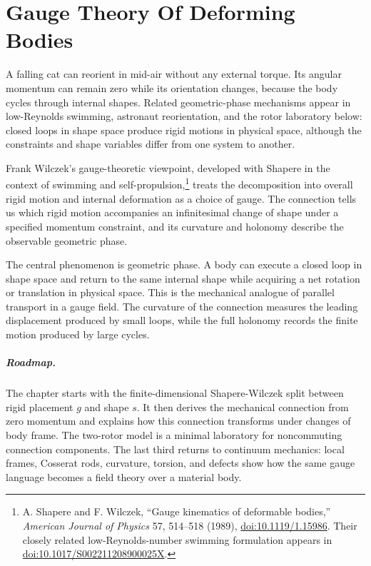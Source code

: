 \chapter{Gauge Theory Of Deforming Bodies}
\label{chap:deforming-body}

A falling cat can reorient in mid-air without any external torque. Its angular
momentum can remain zero while its orientation changes, because the body cycles
through internal shapes. Related geometric-phase mechanisms appear in
low-Reynolds swimming, astronaut reorientation, and the rotor laboratory below:
closed loops in shape space produce rigid motions in physical space, although
the constraints and shape variables differ from one system to another.

Frank Wilczek's gauge-theoretic viewpoint, developed with Shapere in the
context of swimming and self-propulsion,\footnote{A. Shapere and F. Wilczek,
``Gauge kinematics of
deformable bodies,'' \emph{American Journal of Physics} 57, 514--518 (1989),
\href{https://doi.org/10.1119/1.15986}{doi:10.1119/1.15986}. Their closely
related low-Reynolds-number swimming formulation appears in
\href{https://doi.org/10.1017/S002211208900025X}{doi:10.1017/S002211208900025X}.}
treats the decomposition into overall rigid motion and internal deformation as
a choice of gauge.  The connection tells us which rigid motion accompanies an
infinitesimal change of shape under a specified momentum constraint, and its
curvature and holonomy describe the observable geometric phase.

The central phenomenon is geometric phase.  A body can execute a closed loop in
shape space and return to the same internal shape while acquiring a net rotation
or translation in physical space.  This is the mechanical analogue of parallel
transport in a gauge field.  The curvature of the connection measures the
leading displacement produced by small loops, while the full holonomy records
the finite motion produced by large cycles.

\paragraph{Roadmap.}
The chapter starts with the finite-dimensional Shapere-Wilczek split between
rigid placement \(g\) and shape \(s\). It then derives the mechanical
connection from zero momentum and explains how this connection transforms under
changes of body frame. The two-rotor model is a minimal laboratory for
noncommuting connection components. The last third returns to continuum
mechanics: local frames, Cosserat rods, curvature, torsion, and defects show
how the same gauge language becomes a field theory over a material body.

